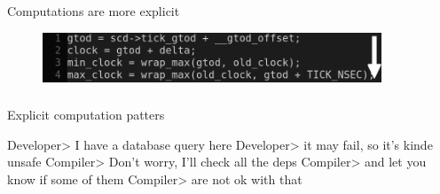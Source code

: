 \documentclass[usenames,dvipsnames, 18pt, compress, aspectratio=169]{beamer}
\begin{document}



\begin{frame}
    \frametitle{}
    \begin{center}
    Computations are more explicit
    \begin{figure}
        \includegraphics[width=0.9\textwidth,center]{instructions_order.png}
    \end{figure}
    \end{center}
\end{frame}

\begin{frame}
    \frametitle{}
    \begin{center}
    Explicit computation patters

    \begin{flushleft}
        Developer> I have a database query here
        Developer> it may fail, so it's kinde unsafe
        Compiler> Don't worry, I'll check all the deps
        Compiler> and let you know if some of them
        Compiler> are not ok with that
    \end{flushleft}
    \end{center}
\end{frame}
\end{document}
